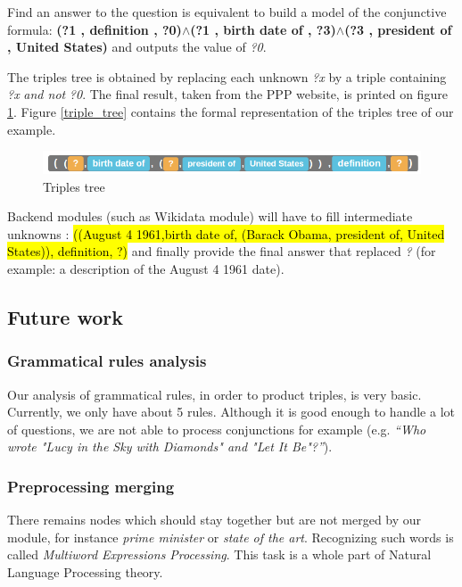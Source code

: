 Find an answer to the question is equivalent to build a model of the conjunctive formula: \textbf{(?1 , definition , ?0)$\wedge$(?1 , birth date of , ?3)$\wedge$(?3 , president of , United States)} and outputs the value of \textit{?0}.

The triples tree is obtained by replacing each unknown \textit{?x} by a triple containing \textit{?x} \textit{and not} \textit{?0}. The final result, taken from the PPP website, is printed on figure \ref{tree_four}. Figure \ref{triple_tree} contains the formal representation of the triples tree of our example.

\begin{figure}[!h]
  \centering
  \caption{Triples tree}
  \label{tree_four}
    \includegraphics[scale=0.5]{../examples_NLP_grammatical/final_result.png}
\end{figure}

Backend modules (such as Wikidata module) will have to fill intermediate unknowns : \hl{((August 4 1961,birth date of, (Barack Obama, president of, United States)), definition, ?)} and finally provide the final answer that replaced \textit{?} (for example: a description of the August 4 1961 date).



\subsection{Future work}

\subsubsection{Grammatical rules analysis}

Our analysis of grammatical rules, in order to product triples, is very basic. Currently, we only have about 5 rules. Although it is good enough to handle a lot of questions, we are not able to process conjunctions for example (e.g. \textit{``Who wrote "Lucy in the Sky with Diamonds" and "Let It Be"?''}).

\subsubsection{Preprocessing merging}

There remains nodes which should stay together but are not merged by our module, for instance \emph{prime minister} or \emph{state of the art}. Recognizing such words is called \emph{Multiword Expressions Processing}. This task is a whole part of Natural Language Processing theory. 

